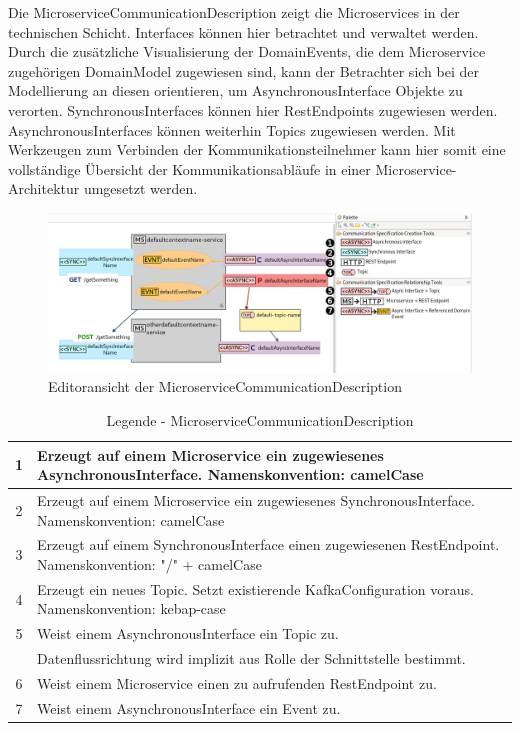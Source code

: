 Die \glqq MicroserviceCommunicationDescription\grqq{} zeigt die Microservices in der technischen Schicht. Interfaces können hier betrachtet und verwaltet werden. Durch die zusätzliche Visualisierung der DomainEvents, die dem Microservice zugehörigen DomainModel zugewiesen sind, kann der Betrachter sich bei der Modellierung an diesen orientieren, um AsynchronousInterface Objekte zu verorten. SynchronousInterfaces können hier RestEndpoints zugewiesen werden. AsynchronousInterfaces können weiterhin Topics zugewiesen werden. Mit Werkzeugen zum Verbinden der Kommunikationsteilnehmer kann hier somit eine vollständige Übersicht der Kommunikationsabläufe in einer Microservice-Architektur umgesetzt werden.

\begin{figure}[ht]
\centering
\includegraphics[width=\textwidth]{bilder/k5/4.png}
\caption{Editoransicht der MicroserviceCommunicationDescription}
\end{figure}


\begin{table}[h]
\centering
\footnotesize
\begin{tabularx}{\textwidth}{|c|X|}
\hline
1 & Erzeugt auf einem Microservice ein zugewiesenes AsynchronousInterface. Namenskonvention: camelCase   \\ \hline
2 & Erzeugt auf einem Microservice ein zugewiesenes SynchronousInterface. Namenskonvention: camelCase \\ \hline
3 & Erzeugt auf einem SynchronousInterface einen zugewiesenen RestEndpoint. Namenskonvention: "/" + camelCase \\ \hline
4 & Erzeugt ein neues Topic. Setzt existierende KafkaConfiguration voraus. Namenskonvention: kebap-case\\ \hline
5 & Weist einem AsynchronousInterface ein Topic zu.\\ & Datenflussrichtung wird implizit aus Rolle der Schnittstelle bestimmt. \\ \hline
6 & Weist einem Microservice einen zu aufrufenden RestEndpoint zu. \\ \hline
7 & Weist einem AsynchronousInterface ein Event zu. \\ \hline
\end{tabularx}
\caption{Legende - MicroserviceCommunicationDescription}
\end{table}

